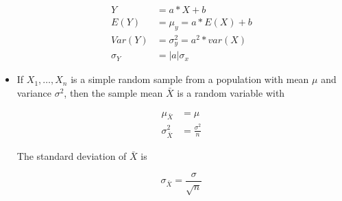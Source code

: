 \documentclass[9pt,landscape]{memoir}
\begin{document}
\begin{multicols}{3}
\begin{itemize}
            \begin{align*}
                Y &= a*X + b \\
                E(Y) &= \mu_y = a * E(X) + b \\
                Var(Y) &= \sigma_y^2 = a^2 * var(X) \\
                \sigma_Y &= |a|\sigma_x
            \end{align*}

        \item If $X_1, \ldots, X_n$ is a simple random sample from a population with mean $\mu$ and variance $\sigma^2$, then the sample mean $\bar{X}$ is a random variable with

            \begin{align*}
                \mu_{\bar{X}} &= \mu \\
                \sigma_{\bar{X}}^2 &= \frac{\sigma^2}{n}
            \end{align*}

        The standard deviation of $\bar{X}$ is

            \begin{equation*}
                \sigma_{\bar{X}} = \frac{\sigma}{\sqrt{n}}
            \end{equation*}
\end{itemize}



\end{multicols}
\end{document}
